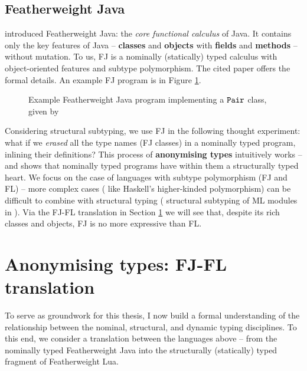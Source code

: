 \subsection{Featherweight Java}
\label{subsec:featherweight-java}

\textcite{featherweight-java} introduced Featherweight Java: the \emph{core functional calculus} of Java. It contains only the key features of Java -- \textbf{classes} and \textbf{objects} with \textbf{fields} and \textbf{methods} -- without mutation. To us, FJ is a nominally (statically) typed calculus with object-oriented features and subtype polymorphism. The cited paper offers the formal details. An example FJ program is in Figure \ref{fig:featherweight-java}.

\begin{figure}
    \centering
    
    \caption{Example Featherweight Java program implementing a $\texttt{Pair}$ class, given by \textcite{featherweight-java}}
    \label{fig:featherweight-java}
\end{figure}

Considering structural subtyping, we use FJ in the following thought experiment: what if we \emph{erased} all the type names (FJ classes) in a nominally typed program, inlining their definitions? This process of \textbf{anonymising types} intuitively works -- and shows that nominally typed programs have within them a structurally typed heart. We focus on the case of languages with subtype polymorphism (FJ and FL) -- more complex cases (\eg{} like Haskell's higher-kinded polymorphism) can be difficult to combine with structural typing (\cf{} structural subtyping of ML modules in \textcite{modular-implicits}).
Via the FJ-FL translation in Section \ref{sec:translations} we will see that, despite its rich classes and objects, FJ is no more expressive than FL.

\section{Anonymising types: FJ-FL translation}
\label{sec:translations}

To serve as groundwork for this thesis, I now build a formal understanding of the relationship between the nominal, structural, and dynamic typing disciplines. To this end, we consider a translation between the languages above -- from the nominally typed Featherweight Java into the structurally (statically) typed fragment of Featherweight Lua. 

